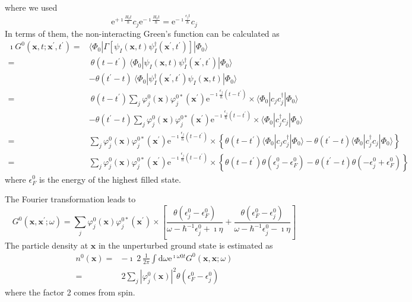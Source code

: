 where we used \[\mathrm{e}^{+\imath\frac{H_{0}t}{\hbar}}c_{j}\mathrm{e}^{-\imath\frac{H_{0}t}{\hbar}}=\mathrm{e}^{-\imath\frac{\epsilon_{j}t}{\hbar}}c_{j}\]
In terms of them, the non-interacting Green's function can be calculated as
\[ \begin{split}
\imath G^{0}(\mathbf{x},t;\mathbf{x}^{'},t^{'})=& \langle \Phi_{0} | \Gamma [ \psi_{I}(\mathbf{x},t) \psi_{I}^{\dagger}(\mathbf{x}^{'},t^{'}) ] | \Phi_{0} \rangle\\
=& \  \theta(t-t^{'}) \  \langle \Phi_{0} | \psi_{I}(\mathbf{x},t) \psi_{I}^{\dagger}(\mathbf{x}^{'},t^{'}) | \Phi_{0} \rangle \\
&-\theta(t^{'}-t) \  \langle \Phi_{0} | \psi_{I}^{\dagger}(\mathbf{x}^{'},t^{'}) \psi_{I}(\mathbf{x},t) | \Phi_{0} \rangle \\
=& \ \theta(t-t^{'}) \sum_{j} \varphi_{j}^{0}(\mathbf{x})\varphi_{j}^{0*}(\mathbf{x}^{'}) \mathrm{e}^{-\imath\frac{\epsilon_{j}}{\hbar}(t-t^{'})}
\times \langle \Phi_{0} | c_{j}c_{j}^{\dagger} | \Phi_{0} \rangle \\
&-\theta(t^{'}-t) \sum_{j} \varphi_{j}^{0}(\mathbf{x})\varphi_{j}^{0*}(\mathbf{x}^{'}) \mathrm{e}^{-\imath\frac{\epsilon_{j}}{\hbar}(t-t^{'})}
\times \langle \Phi_{0} | c_{j}^{\dagger}c_{j} | \Phi_{0} \rangle\\
=&\sum_{j} \varphi_{j}^{0}(\mathbf{x})\varphi_{j}^{0*}(\mathbf{x}^{'}) \mathrm{e}^{-\imath\frac{\epsilon_{j}}{\hbar}(t-t^{'})} \times \left \{ \theta(t-t^{'})\langle \Phi_{0} | c_{j}c_{j}^{\dagger} | \Phi_{0} \rangle
-\theta(t^{'}-t)\langle \Phi_{0} | c_{j}^{\dagger}c_{j} | \Phi_{0} \rangle \right \}\\
=& \sum_{j} \varphi_{j}^{0}(\mathbf{x})\varphi_{j}^{0*}(\mathbf{x}^{'}) \mathrm{e}^{-\imath\frac{\epsilon_{j}}{\hbar}(t-t^{'})} \times \left \{ \theta(t-t^{'})\theta(\epsilon_{j}^{0}-\epsilon_{F}^{0}) - \theta(t^{'}-t)\theta(-\epsilon_{j}^{0}+\epsilon_{F}^{0}) \right \}
\end{split} \]
where $\epsilon_{F}^{0}$ is the energy of the highest filled state.

The Fourier transformation leads to
\begin{equation}\label{Eqs2.6.3}
G^{0}(\mathbf{x},\mathbf{x}^{'};\omega) = \sum_{j} \varphi_{j}^{0}(\mathbf{x})\varphi_{j}^{0*}(\mathbf{x}^{'}) \times \left[
\frac{\theta(\epsilon_{j}^{0}-\epsilon_{F}^{0})}{\omega-\hbar^{-1}\epsilon_{j}^{0}+\imath\eta} +\frac{\theta(\epsilon_{F}^{0}-\epsilon_{j}^{0})}{\omega-\hbar^{-1}\epsilon_{j}^{0}-\imath\eta}
 \right]
\end{equation}
The particle density at $\mathbf{x}$ in the unperturbed ground state is estimated as
\[ \begin{split} n^{0}(\mathbf{x}) =& -\imath \  2 \ \frac{1}{2\pi} \int \mathrm{d} \omega \mathrm{e}^{\imath\omega 0 t} G^{0}(\mathbf{x},\mathbf{x};\omega)\\
=& 2 \sum_{j} |\varphi_{j}^{0}(\mathbf{x})|^{2} \theta(\epsilon_{F}^{0}-\epsilon_{j}^{0})
\end{split}\]
where the factor 2 comes from spin.


